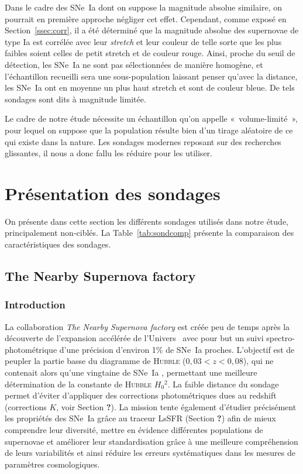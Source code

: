 \documentclass[../main/main.tex]{subfiles}
\begin{document}
Dans le cadre des SNe~Ia dont on suppose la magnitude absolue similaire, on
pourrait en première approche négliger cet effet. Cependant, comme exposé en
Section~\ref{ssec:corr}, il a été déterminé que la magnitude absolue des
supernovae de type Ia est corrélée avec leur \textit{stretch} et leur couleur de
telle sorte que les plus faibles soient celles de petit stretch et de couleur
rouge. Ainsi, proche du seuil de détection, les SNe~Ia ne sont pas sélectionnées
de manière homogène, et l'échantillon recueilli sera une sous-population
laissant penser qu'avec la distance, les SNe~Ia ont en moyenne un plus haut
stretch et sont de couleur bleue. De tels sondages sont dits à magnitude
limitée.

Le cadre de notre étude nécessite un échantillon qu'on appelle
«~volume-limité~», pour lequel on suppose que la population résulte bien d'un
tirage aléatoire de ce qui existe dans la nature. Les sondages modernes reposant
sur des recherches glissantes, il nous a donc fallu les réduire pour les
utiliser.

\section{Présentation des sondages}\label{sec:surveys}
On présente dans cette section les différents sondages utilisés dans notre
étude, principalement non-ciblés. La Table~\ref{tab:sondcomp} présente la
comparaison des caractéristiques des sondages.

\subsection{The Nearby Supernova factory}\label{ssec:snf}
\subsubsection{Introduction}\label{sssec:snfintro}

La collaboration \textit{The Nearby Supernova factory}
\citep[SNfactory,][]{aldering2002} est créée peu de temps après la découverte de
l'expansion accélérée de l'Univers~\citep{riess1998, perlmutter1999} avec pour
but un suivi spectro-photométrique d'une précision d'environ 1\% de SNe~Ia
proches. L'objectif est de peupler la partie basse du diagramme de
\textsc{Hubble} ($0,03 < z < 0,08$), qui ne contenait alors qu'une vingtaine de
SNe~Ia \citep{hamuy1996}, permettant une meilleure détermination de la constante
de \textsc{Hubble} $H_0{}^2$. La faible distance du sondage permet d'éviter
d'appliquer des corrections photométriques dues au redshift
(corrections $K$, voir Section \textbf{?}). La mission tente également d'étudier
précisément les propriétés des SNe~Ia grâce au traceur LsSFR (Section
\textbf{?}) afin de mieux comprendre leur diversité, mettre en évidence
différentes populations de supernovae et améliorer leur standardisation grâce à
une meilleure compréhension de leurs variabilités et ainsi réduire les erreurs
systématiques dans les mesures de paramètres cosmologiques.
\end{document}
